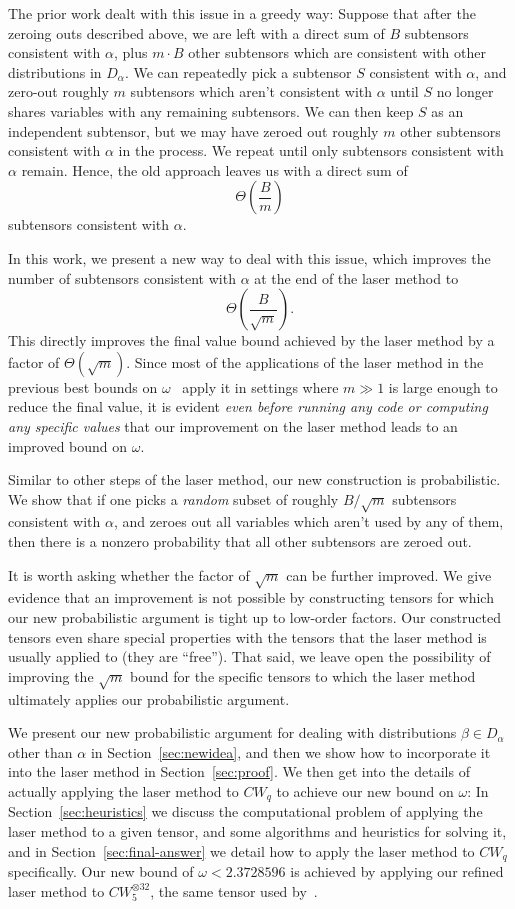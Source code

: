 \PassOptionsToPackage{shortlabels}{enumitem}\documentclass[10pt,a4paper]{article}
\begin{document}
The prior work dealt with this issue in a greedy way: Suppose that after the zeroing outs described above, we are left with a direct sum of $B$ subtensors consistent with $\alpha$, plus $m \cdot B$ other subtensors which are consistent with other distributions in $D_\alpha$. We can repeatedly pick a subtensor $S$ consistent with $\alpha$, and zero-out roughly $m$ subtensors which aren't consistent with $\alpha$ until $S$ no longer shares variables with any remaining subtensors. We can then keep $S$ as an independent subtensor, but we may have zeroed out roughly $m$ other subtensors consistent with $\alpha$ in the process. We repeat until only subtensors consistent with $\alpha$ remain. Hence, the old approach leaves us with a direct sum of $$\Theta\left(\frac{B}{m}\right)$$ subtensors consistent with $\alpha$.

In this work, we present a new way to deal with this issue, which improves the number of subtensors consistent with $\alpha$ at the end of the laser method to $$\Theta\left( \frac{B}{\sqrt{m}}\right).$$ 
This directly improves the final value bound achieved by the laser method by a factor of $\Theta(\sqrt{m})$. Since most of the applications of the laser method in the previous best bounds on $\omega$~\cite{v12,legall} apply it in settings where $m \gg 1$ is large enough to reduce the final value, it is evident \emph{even before running any code or computing any specific values} that our improvement on the laser method leads to an improved bound on $\omega$.

Similar to other steps of the laser method, our new construction is probabilistic. We show that if one picks a \emph{random} subset of roughly $B / \sqrt{m}$ subtensors consistent with $\alpha$, and zeroes out all variables which aren't used by any of them, then there is a nonzero probability that all other subtensors are zeroed out.

It is worth asking whether the factor of $\sqrt{m}$ can be further improved. We give evidence that an improvement is not possible by constructing tensors for which our new probabilistic argument is tight up to low-order factors.  Our constructed tensors even share special properties with the tensors that the laser method is usually applied to (they are ``free'').
That said, we leave open the possibility of improving the $\sqrt m$ bound for the specific tensors to which the laser method ultimately applies our probabilistic argument. 

We present our new probabilistic argument for dealing with distributions $\beta \in D_\alpha$ other than $\alpha$ in Section~\ref{sec:newidea}, and then we show how to incorporate it into the laser method in Section~\ref{sec:proof}. We then get into the details of actually applying the laser method to $CW_q$ to achieve our new bound on $\omega$: In Section~\ref{sec:heuristics} we discuss the computational problem of applying the laser method to a given tensor, and some algorithms and heuristics for solving it, and in Section~\ref{sec:final-answer} we detail how to apply the laser method to $CW_q$ specifically. Our new bound of $\omega<2.3728596$ is achieved by applying our refined laser method to $CW_5^{\otimes 32}$, the same tensor used by~\cite{legall}.
\end{document}
